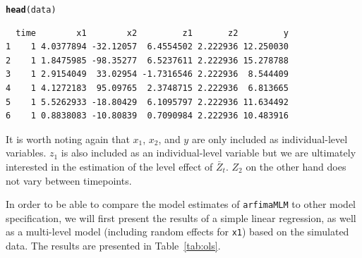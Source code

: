 \documentclass[12pt]{paper}\usepackage[]{graphicx}\usepackage[]{color}
\makeatletter
\newcommand{\hlstd}[1]{\textcolor[rgb]{0.345,0.345,0.345}{#1}}%
\newcommand{\hlkwd}[1]{\textcolor[rgb]{0.737,0.353,0.396}{\textbf{#1}}}%
\newenvironment{kframe}{%
 \def\at@end@of@kframe{}%
 \ifinner\ifhmode%
  \def\at@end@of@kframe{\end{minipage}}%
  \begin{minipage}{\columnwidth}%
 \fi\fi%
 \def\FrameCommand##1{\hskip\@totalleftmargin \hskip-\fboxsep
 \colorbox{shadecolor}{##1}\hskip-\fboxsep
     \hskip-\linewidth \hskip-\@totalleftmargin \hskip\columnwidth}%
 \MakeFramed {\advance\hsize-\width
   \@totalleftmargin\z@ \linewidth\hsize
   \@setminipage}}%
 {\par\unskip\endMakeFramed%
 \at@end@of@kframe}
\newenvironment{knitrout}{}{} %
\makeatother
\begin{document}
\begin{knitrout}
\color{fgcolor}\begin{kframe}
\begin{alltt}
\hlkwd{head}\hlstd{(data)}
\end{alltt}
\begin{verbatim}
  time        x1        x2         z1       z2         y
1    1 4.0377894 -32.12057  6.4554502 2.222936 12.250030
2    1 1.8475985 -98.35277  6.5237611 2.222936 15.278788
3    1 2.9154049  33.02954 -1.7316546 2.222936  8.544409
4    1 4.1272183  95.09765  2.3748715 2.222936  6.813665
5    1 5.5262933 -18.80429  6.1095797 2.222936 11.634492
6    1 0.8838083 -10.80839  0.7090984 2.222936 10.483916
\end{verbatim}
\end{kframe}
\end{knitrout}

It is worth noting again that $x_1$, $x_2$, and $y$ are only included as individual-level variables. $z_1$ is also included as an individual-level variable but we are ultimately interested in the estimation of the level effect of $\bar{Z}_t$. $Z_2$ on the other hand does not vary between timepoints.

In order to be able to compare the model estimates of \texttt{arfimaMLM} to other model specification, we will first present the results of a simple linear regression, as well as a multi-level model (including random effects for \texttt{x1}) based on the simulated data. The results are presented in Table~\ref{tab:ols}.
\end{document}
